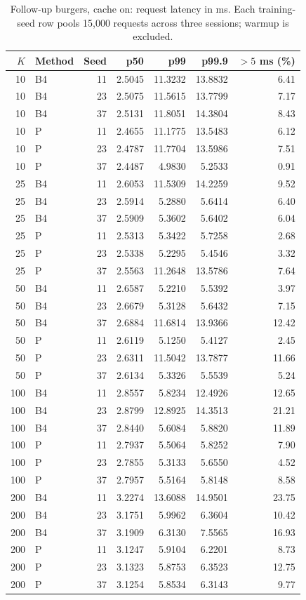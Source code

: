 \begin{table}[ht]
\centering\small
\caption{Follow-up burgers, cache on: request latency in ms. Each training-seed row pools 15,000 requests across three sessions; warmup is excluded.}\label{tab:e2_seed_burgers_on}
\begin{tabular}{@{}rlrrrrr@{}}\toprule
$K$ & Method & Seed & p50 & p99 & p99.9 & $>5$ ms (\%)\\\midrule
10 & B4 & 11 & 2.5045 & 11.3232 & 13.8832 & 6.41\\
10 & B4 & 23 & 2.5075 & 11.5615 & 13.7799 & 7.17\\
10 & B4 & 37 & 2.5131 & 11.8051 & 14.3804 & 8.43\\
10 & P & 11 & 2.4655 & 11.1775 & 13.5483 & 6.12\\
10 & P & 23 & 2.4787 & 11.7704 & 13.5986 & 7.51\\
10 & P & 37 & 2.4487 & 4.9830 & 5.2533 & 0.91\\
25 & B4 & 11 & 2.6053 & 11.5309 & 14.2259 & 9.52\\
25 & B4 & 23 & 2.5914 & 5.2880 & 5.6414 & 6.40\\
25 & B4 & 37 & 2.5909 & 5.3602 & 5.6402 & 6.04\\
25 & P & 11 & 2.5313 & 5.3422 & 5.7258 & 2.68\\
25 & P & 23 & 2.5338 & 5.2295 & 5.4546 & 3.32\\
25 & P & 37 & 2.5563 & 11.2648 & 13.5786 & 7.64\\
50 & B4 & 11 & 2.6587 & 5.2210 & 5.5392 & 3.97\\
50 & B4 & 23 & 2.6679 & 5.3128 & 5.6432 & 7.15\\
50 & B4 & 37 & 2.6884 & 11.6814 & 13.9366 & 12.42\\
50 & P & 11 & 2.6119 & 5.1250 & 5.4127 & 2.45\\
50 & P & 23 & 2.6311 & 11.5042 & 13.7877 & 11.66\\
50 & P & 37 & 2.6134 & 5.3326 & 5.5539 & 5.24\\
100 & B4 & 11 & 2.8557 & 5.8234 & 12.4926 & 12.65\\
100 & B4 & 23 & 2.8799 & 12.8925 & 14.3513 & 21.21\\
100 & B4 & 37 & 2.8440 & 5.6084 & 5.8820 & 11.89\\
100 & P & 11 & 2.7937 & 5.5064 & 5.8252 & 7.90\\
100 & P & 23 & 2.7855 & 5.3133 & 5.6550 & 4.52\\
100 & P & 37 & 2.7957 & 5.5164 & 5.8148 & 8.58\\
200 & B4 & 11 & 3.2274 & 13.6088 & 14.9501 & 23.75\\
200 & B4 & 23 & 3.1751 & 5.9962 & 6.3604 & 10.42\\
200 & B4 & 37 & 3.1909 & 6.3130 & 7.5565 & 16.93\\
200 & P & 11 & 3.1247 & 5.9104 & 6.2201 & 8.73\\
200 & P & 23 & 3.1323 & 5.8753 & 6.3523 & 12.75\\
200 & P & 37 & 3.1254 & 5.8534 & 6.3143 & 9.77\\
\bottomrule\end{tabular}
\end{table}

